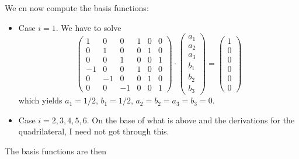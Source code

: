 We cn now compute the basis functions:

\begin{itemize}
\item Case $i=1$. We have to solve
\[
\left(\begin{array}{cccccc}
1 & 0 & 0 & 1 & 0 & 0 \\
0 & 1 & 0 & 0 & 1 & 0 \\
0 & 0 & 1 & 0 & 0 & 1 \\
-1 & 0 & 0 & 1 & 0 & 0 \\
0 & -1 & 0 & 0 & 1 & 0 \\
0 & 0 & -1 & 0 & 0 & 1 
\end{array}\right)
\cdot
\left(\begin{array}{c}
a_1 \\ a_2 \\ a_3 \\ b_1 \\ b_2 \\ b_3
\end{array}\right)
=
\left(\begin{array}{c}
1 \\ 0 \\ 0 \\ 0 \\ 0 \\ 0
\end{array}\right)
\]
which yields
$a_1=1/2$, $b_1=1/2$, $a_2=b_2=a_3=b_3=0$.

\item Case $i=2,3,4,5,6$. On the base of what is above and the derivations for the 
quadrilateral, I need not got through this.

\end{itemize}

The basis functions are then

